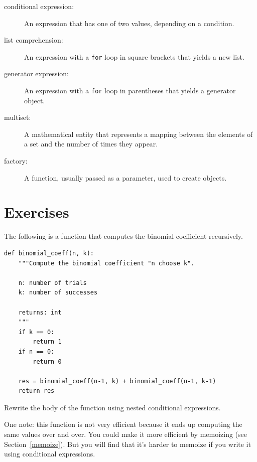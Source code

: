 \documentclass[10pt]{book}
\begin{document}
\begin{description}

\item[conditional expression:] An expression that has one of two
values, depending on a condition.

\item[list comprehension:] An expression with a {\tt for} loop in square
brackets that yields a new list.

\item[generator expression:] An expression with a {\tt for} loop in parentheses
that yields a generator object.

\item[multiset:] A mathematical entity that represents a mapping
between the elements of a set and the number of times they appear.

\item[factory:] A function, usually passed as a parameter, used to
create objects.

\end{description}




\section{Exercises}

\begin{exercise}

The following is a function that computes the binomial
coefficient recursively.

\begin{verbatim}
def binomial_coeff(n, k):
    """Compute the binomial coefficient "n choose k".

    n: number of trials
    k: number of successes

    returns: int
    """
    if k == 0:
        return 1
    if n == 0:
        return 0

    res = binomial_coeff(n-1, k) + binomial_coeff(n-1, k-1)
    return res
\end{verbatim}

Rewrite the body of the function using nested conditional
expressions.

One note: this function is not very efficient because it ends up computing
the same values over and over.  You could make it more efficient by
memoizing (see Section~\ref{memoize}).  But you will find that it's harder to
memoize if you write it using conditional expressions.

\end{exercise}
\end{document}
